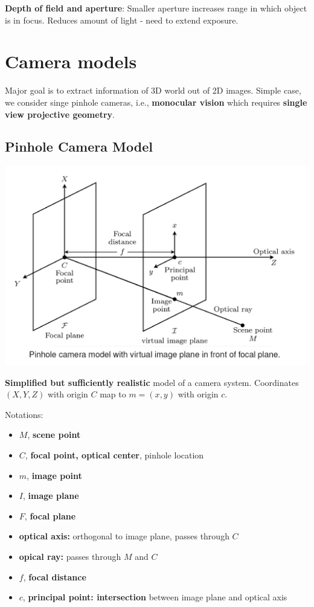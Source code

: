 \textbf{Depth of field and aperture}: Smaller aperture increases range in which object is in focus. Reduces amount of light - need to extend exposure.

\section{Camera models}

Major goal is to extract information of 3D world out of 2D images. Simple case, we consider singe pinhole cameras, i.e., \textbf{monocular vision} which requires \textbf{single view projective geometry}.

\subsection{Pinhole Camera Model}

\includegraphics[width=\textwidth]{images/chap7/pinhole_model}

\textbf{Simplified but sufficiently realistic} model of a camera system. Coordinates $(X,Y,Z)$ with origin $C$ map to $m=(x,y)$ with origin $c$.

Notations: \begin{itemize}
    \item $M$, \textbf{scene point}
    \item $C$, \textbf{focal point, optical center}, pinhole location
    \item $m$, \textbf{image point}
    \item $I$, \textbf{image plane}
    \item $F$, \textbf{focal plane}
    \item \textbf{optical axis:} orthogonal to image plane, passes through $C$
    \item \textbf{opical ray:} passes through $M$ and $C$
    \item $f$, \textbf{focal distance}
    \item $c$, \textbf{principal point: intersection} between image plane and optical axis
\end{itemize}

